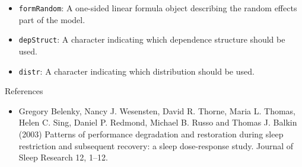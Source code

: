 \documentclass[
  ignorenonframetext,
]{beamer}
\providecommand{\tightlist}{%
  \setlength{\itemsep}{0pt}\setlength{\parskip}{0pt}}
\begin{document}
\begin{frame}[fragile]

\begin{itemize}
\item
  \texttt{formRandom}: A one-sided linear formula object describing the
  random effects part of the model.
\item
  \texttt{depStruct}: A character indicating which dependence structure
  should be used.
\item
  \texttt{distr}: A character indicating which distribution should be
  used.
\end{itemize}

\end{frame}

\begin{frame}{References}
\protect\hypertarget{references}{}

\begin{itemize}
\tightlist
\item
  Gregory Belenky, Nancy J. Wesensten, David R. Thorne, Maria L. Thomas,
  Helen C. Sing, Daniel P. Redmond, Michael B. Russo and Thomas J.
  Balkin (2003) Patterns of performance degradation and restoration
  during sleep restriction and subsequent recovery: a sleep
  dose-response study. Journal of Sleep Research 12, 1--12.
\end{itemize}

\end{frame}
\end{document}
